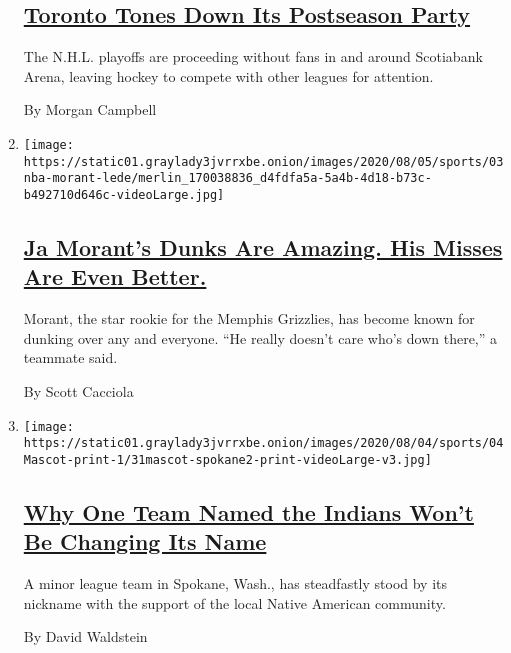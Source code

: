 \begin{enumerate}
  \hypertarget{toronto-tones-down-its-postseason-party}{%
  \subsection{\texorpdfstring{\href{/2020/08/04/sports/toronto-nhl-playoffs.html}{Toronto
  Tones Down Its Postseason
  Party}}{Toronto Tones Down Its Postseason Party}}\label{toronto-tones-down-its-postseason-party}}

  The N.H.L. playoffs are proceeding without fans in and around
  Scotiabank Arena, leaving hockey to compete with other leagues for
  attention.

  By Morgan Campbell
\item
  \texttt{[image: https://static01.graylady3jvrrxbe.onion/images/2020/08/05/sports/03nba-morant-lede/merlin\_170038836\_d4fdfa5a-5a4b-4d18-b73c-b492710d646c-videoLarge.jpg]}

  \hypertarget{ja-morants-dunks-are-amazing-his-misses-are-even-better}{%
  \subsection{\texorpdfstring{\href{/2020/08/03/sports/basketball/ja-morant-grizzlies-dunks.html}{Ja
  Morant's Dunks Are Amazing. His Misses Are Even
  Better.}}{Ja Morant's Dunks Are Amazing. His Misses Are Even Better.}}\label{ja-morants-dunks-are-amazing-his-misses-are-even-better}}

  Morant, the star rookie for the Memphis Grizzlies, has become known
  for dunking over any and everyone. ``He really doesn't care who's down
  there,'' a teammate said.

  By Scott Cacciola
\item
  \texttt{[image: https://static01.graylady3jvrrxbe.onion/images/2020/08/04/sports/04Mascot-print-1/31mascot-spokane2-print-videoLarge-v3.jpg]}

  \hypertarget{why-one-team-named-the-indians-wont-be-changing-its-name}{%
  \subsection{\texorpdfstring{\href{/2020/08/03/sports/baseball/indians-team-names-mascots.html}{Why
  One Team Named the Indians Won't Be Changing Its
  Name}}{Why One Team Named the Indians Won't Be Changing Its Name}}\label{why-one-team-named-the-indians-wont-be-changing-its-name}}

  A minor league team in Spokane, Wash., has steadfastly stood by its
  nickname with the support of the local Native American community.

  By David Waldstein
\end{enumerate}

